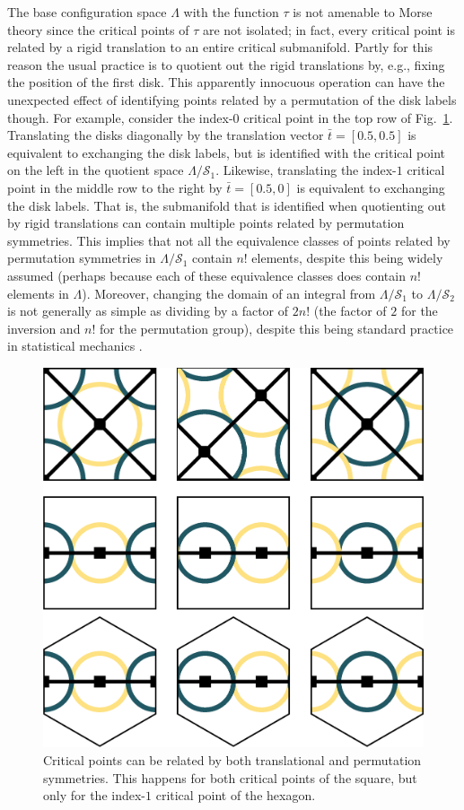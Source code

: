 \documentclass[default,iicol]{sn-jnl}%
\theoremstyle{thmstyleone}%
\theoremstyle{thmstyletwo}%
\theoremstyle{thmstylethree}%
\renewcommand{\vec}[1]{\bar{#1}}
\begin{document}
The base configuration space $\Lambda$ with the function $\tau$ is not amenable to Morse theory since the critical points of $\tau$ are not isolated; in fact, every critical point is related by a rigid translation to an entire critical submanifold. Partly for this reason the usual practice is to quotient out the rigid translations by, e.g., fixing the position of the first disk. This apparently innocuous operation can have the unexpected effect of identifying points related by a permutation of the disk labels though. For example, consider the index-$0$ critical point in the top row of Fig.\ \ref{fig:figure8}. Translating the disks diagonally by the translation vector $\vec{t} = [0.5, 0.5]$ is equivalent to exchanging the disk labels, but is identified with the critical point on the left in the quotient space $\Lambda/\mathcal{S}_1$. Likewise, translating the index-$1$ critical point in the middle row to the right by $\vec{t} = [0.5, 0]$ is equivalent to exchanging the disk labels. That is, the submanifold that is identified when quotienting out by rigid translations can contain multiple points related by permutation symmetries. This implies that not all the equivalence classes of points related by permutation symmetries in $\Lambda/\mathcal{S}_1$ contain $n!$ elements, despite this being widely assumed (perhaps because each of these equivalence classes does contain $n!$ elements in $\Lambda$). Moreover, changing the domain of an integral from $\Lambda/\mathcal{S}_1$ to $\Lambda/\mathcal{S}_2$ is not generally as simple as dividing by a factor of $2 n!$ (the factor of $2$ for the inversion and $n!$ for the permutation group), despite this being standard practice in statistical mechanics \cite{gould2010statistical,peliti2011statistical}.

\begin{figure}
	\centering
	\includegraphics[width=0.7\columnwidth]{figure8.eps}
	\caption{Critical points can be related by both translational and permutation symmetries. This happens for both critical points of the square, but only for the index-$1$ critical point of the hexagon.}
	\label{fig:figure8}
\end{figure}
\end{document}
